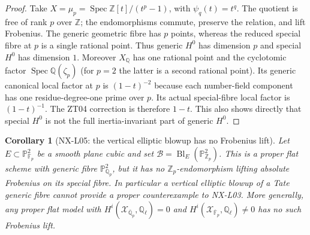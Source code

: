 \documentclass[11pt]{article}
\newtheorem{corollary}[theorem]{Corollary}
\theoremstyle{remark}
\begin{document}
\begin{proof}
Take $X=\mu_p=\operatorname{Spec}\mathbb Z[t]/(t^p-1)$, with
$\psi_q(t)=t^q$.  The quotient is free of rank $p$ over $\mathbb Z$;
the endomorphisms commute, preserve the relation, and lift Frobenius.
The generic geometric fibre has $p$ points, whereas the reduced
special fibre at $p$ is a single rational point.  Thus generic $H^0$
has dimension $p$ and special $H^0$ has dimension $1$.
Moreover $X_{\mathbb Q}$ has one rational point and the cyclotomic
factor $\operatorname{Spec}\mathbb Q(\zeta_p)$ (for $p=2$ the latter
is a second rational point).  Its generic canonical local factor at
$p$ is $(1-t)^{-2}$ because each number-field component has one
residue-degree-one prime over $p$.  Its actual special-fibre local
factor is $(1-t)^{-1}$.  The ZT04 correction is therefore $1-t$.
This also shows directly that special $H^0$ is not the full
inertia-invariant part of generic $H^0$.
\end{proof}

\begin{corollary}[NX-L05: the vertical elliptic blowup has no Frobenius lift]
\label{NX-L05}
Let $E\subset\mathbb P^2_{\mathbb F_p}$ be a smooth plane cubic and set
$\mathcal B=\operatorname{Bl}_{E}(\mathbb P^2_{\mathbb Z_p})$.
This is a proper flat scheme with generic fibre $\mathbb P^2_{\mathbb Q_p}$,
but it has no $\mathbb Z_p$-endomorphism lifting absolute Frobenius on
its special fibre.  In particular a vertical elliptic blowup of a
Tate generic fibre cannot provide a proper counterexample to NX-L03.
More generally, any proper flat model with
$H^i(\mathcal X_{\overline{\mathbb Q}_p},\mathbb Q_\ell)=0$ and
$H^i(\mathcal X_{\overline{\mathbb F}_p},\mathbb Q_\ell)\ne0$ has no
such Frobenius lift.
\end{corollary}
\end{document}
